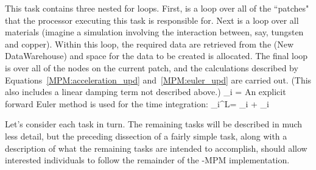 This task contains three nested for loops.  First, is a loop over all of the
``patches" that the processor executing this task is responsible for.  Next
is a loop over all materials (imagine a simulation involving the interaction
between, say, tungsten and copper).  Within this loop, the required data
are retrieved from the  (New DataWarehouse) and space for the data
to be created is allocated.  The final loop is over all of the nodes on
the current patch, and the calculations described by
Equations~\ref{MPM:acceleration_upd} and~\ref{MPM:euler_upd} are carried out.  (This
also includes a linear damping term not described above.)
\Beq
  \bfa_i = 
  \label{MPM:acceleration_upd}
\Eeq
An explicit forward Euler method is used for the time integration:
\Beq
  \bfv_i^L= \bfv_i + \bfa_i 
  \label{MPM:euler_upd}
\Eeq

Let's consider each task in turn.  The remaining tasks will be described
in much less detail, but the preceding dissection of a fairly simple task,
along with a description of what the remaining tasks are intended to 
accomplish, should allow interested individuals to follow the remainder
of the \Vaango-MPM implementation.

